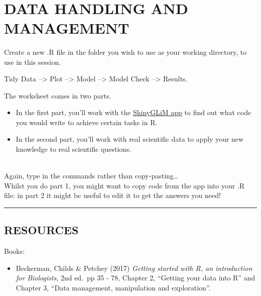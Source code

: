 \documentclass[
]{book}
\providecommand{\tightlist}{%
  \setlength{\itemsep}{0pt}\setlength{\parskip}{0pt}}
\begin{document}
~
~

\hypertarget{data-handling-and-management}{%
\chapter{DATA HANDLING AND MANAGEMENT}\label{data-handling-and-management}}

Create a new .R file in the folder you wish to use as your working directory, to
use in this session.

Tidy Data --\textgreater{} Plot --\textgreater{} Model --\textgreater{} Model Check --\textgreater{} Results.

The worksheet comes in two parts.

\begin{itemize}
\tightlist
\item
  In the first part, you'll work with the
  \href{https://iainmstott.shinyapps.io/ShinyGLiM}{ShinyGLiM app}
  to find out what code you would write to achieve certain tasks in R.
\item
  In the second part,
  you'll work with real scientific data to apply your new knowledge to real scientific
  questions.\\
  ~\\
\end{itemize}

Again, type in the commands rather than copy-pasting\ldots{}\\

Whilst you do part 1, you might want to copy code from the app into your .R
file: in part 2 it might be useful to edit it to get the answers you need!\\

\begin{center}\rule{0.5\linewidth}{\linethickness}\end{center}

\hypertarget{resources}{%
\section{RESOURCES}\label{resources}}

Books:

\begin{itemize}
\tightlist
\item
  Beckerman, Childs \& Petchey (2017) \emph{Getting started with R, an
  introduction for Biologists}, 2nd ed.~pp 35 - 78, Chapter 2, ``Getting your
  data into R'' and Chapter 3, ``Data management, manipulation and exploration''.
  ~
\end{itemize}
\end{document}
